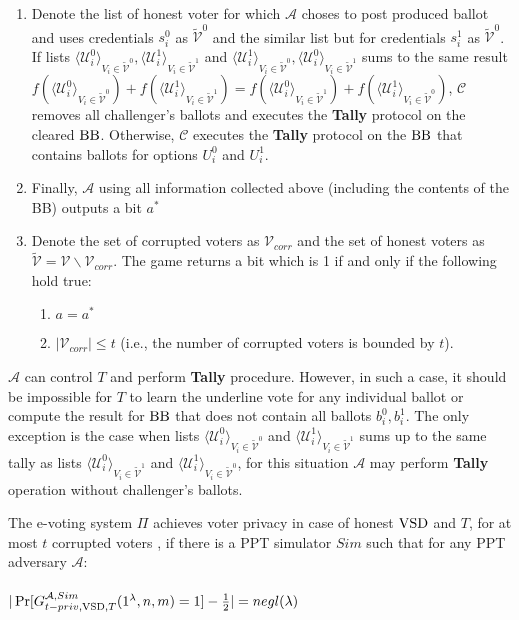 \begin{enumerate}
\item Denote the list of honest voter for which $\mathcal{A}$ choses to post produced ballot and uses credentials $s_i^0$  as $ \tilde{\mathcal{V}}^0$ and the similar list but for credentials $s_i^1$ as $ \tilde{\mathcal{V}}^0$.  If  lists $\langle \mathcal{U}^0_i \rangle _{V_i \in \tilde{\mathcal{V}}^0}, \langle \mathcal{U}^1_i \rangle _{V_i \in \tilde{\mathcal{V}}^1}$ and $\langle \mathcal{U}^1_i \rangle _{V_i \in \tilde{\mathcal{V}}^0}, \langle \mathcal{U}^0_i \rangle _{V_i \in \tilde{\mathcal{V}}^1}$ sums to the same result $f(\langle \mathcal{U}^0_i \rangle _{V_i \in \tilde{\mathcal{V}}^0} ) + f(\langle \mathcal{U}^1_i \rangle _{V_i \in \tilde{\mathcal{V}}^1} ) =  f(\langle \mathcal{U}^0_i \rangle _{V_i \in \tilde{\mathcal{V}}^1} ) +  f(\langle \mathcal{U}^1_i \rangle _{V_i \in \tilde{\mathcal{V}}^0} )$, $\mathcal{C}$ removes all challenger's ballots and executes the \textbf{Tally} protocol on the cleared $\operatorname{BB}$. Otherwise, $\mathcal{C}$ executes the \textbf{Tally} protocol on the $\operatorname{BB}$ that contains ballots for options $U_i^0$ and $U_i^1$. 
\item Finally, $\mathcal{A}$ using all information collected above (including the contents of the BB) outputs a bit $a^*$
\item Denote the set of corrupted voters as $\mathcal{V}_{corr}$ and the set of honest voters as $\tilde{\mathcal{V}}= \mathcal{V} \backslash \mathcal{V}_{corr}$. The game returns a bit which is 1 if and only if the following hold true:
\begin{enumerate}
 \item $a = a^*$
 \item $|\mathcal{V}_{corr}| \leq t$ (i.e., the number of corrupted voters is bounded by $t$).
\end{enumerate}
\end{enumerate}
\begin{remark}
$\mathcal{A}$ can control $T$ and perform \textbf{Tally} procedure. However, in such a case, it should be impossible for $T$ to learn the underline vote for any individual ballot or compute the result for $\operatorname{BB}$ that does not contain all ballots $b_i^0,b_i^1$. The only exception is the case when lists  $\langle \mathcal{U}^0_i \rangle _{V_i \in \tilde{\mathcal{V}}^0} $ and  $\langle \mathcal{U}^1_i \rangle _{V_i \in \tilde{\mathcal{V}}^1} $ sums up to the same tally as lists  $\langle \mathcal{U}^0_i \rangle _{V_i \in \tilde{\mathcal{V}}^1} $ and  $\langle \mathcal{U}^1_i \rangle _{V_i \in \tilde{\mathcal{V}}^0} $, for this situation $\mathcal{A}$ may perform \textbf{Tally} operation without challenger's ballots. 
\end{remark}
The e-voting system $\Pi$ achieves voter privacy in case of honest $\operatorname{VSD}$ and $T$, for at most $t$ corrupted voters , if there is a PPT simulator $Sim$ such that for any PPT adversary $\mathcal{A}$:\\\\
 $|\Pr[G_{t-priv,\operatorname{VSD},T}^{\mathcal{A},Sim}(1^{\lambda},n,m) = 1] - \frac{1}{2}| = negl(\lambda)$
